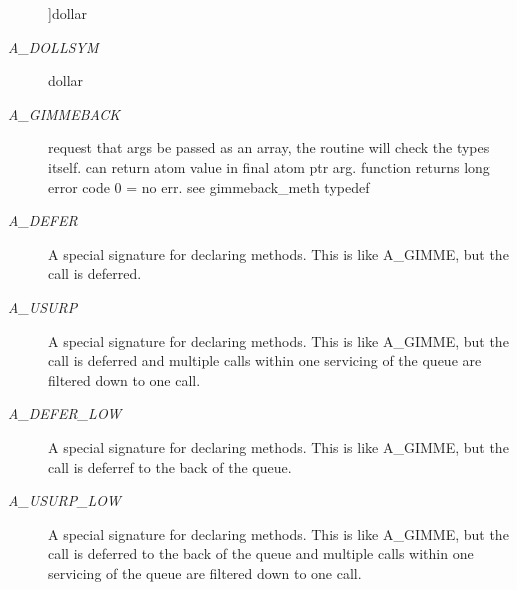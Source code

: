 \begin{Desc}
\begin{description}
{\label{group__atom_gga8aa6700e9f00b132eb376db6e39ade47af0a5a9017f6b59e82a4859cd0560d36b}
}]dollar \item[{\em 
\hypertarget{group__atom_gga8aa6700e9f00b132eb376db6e39ade47a9d47aadc47f728c2af7be2ec12a4a8c5}{
A\_\-DOLLSYM}
\label{group__atom_gga8aa6700e9f00b132eb376db6e39ade47a9d47aadc47f728c2af7be2ec12a4a8c5}
}]dollar \item[{\em 
\hypertarget{group__atom_gga8aa6700e9f00b132eb376db6e39ade47ad150bf3de9c8dc2ddfa0ca0ca2382360}{
A\_\-GIMMEBACK}
\label{group__atom_gga8aa6700e9f00b132eb376db6e39ade47ad150bf3de9c8dc2ddfa0ca0ca2382360}
}]request that args be passed as an array, the routine will check the types itself. can return atom value in final atom ptr arg. function returns long error code 0 = no err. see gimmeback\_\-meth typedef \item[{\em 
\hypertarget{group__atom_gga8aa6700e9f00b132eb376db6e39ade47abcb435e6fecfdcd79276dc8db1988db3}{
A\_\-DEFER}
\label{group__atom_gga8aa6700e9f00b132eb376db6e39ade47abcb435e6fecfdcd79276dc8db1988db3}
}]A special signature for declaring methods. This is like A\_\-GIMME, but the call is deferred. \item[{\em 
\hypertarget{group__atom_gga8aa6700e9f00b132eb376db6e39ade47af563cdbe6db453f24552bbe7fe6762d8}{
A\_\-USURP}
\label{group__atom_gga8aa6700e9f00b132eb376db6e39ade47af563cdbe6db453f24552bbe7fe6762d8}
}]A special signature for declaring methods. This is like A\_\-GIMME, but the call is deferred and multiple calls within one servicing of the queue are filtered down to one call. \item[{\em 
\hypertarget{group__atom_gga8aa6700e9f00b132eb376db6e39ade47a4556bc5fe0d4f8cc55eda5aeeee55cf2}{
A\_\-DEFER\_\-LOW}
\label{group__atom_gga8aa6700e9f00b132eb376db6e39ade47a4556bc5fe0d4f8cc55eda5aeeee55cf2}
}]A special signature for declaring methods. This is like A\_\-GIMME, but the call is deferref to the back of the queue. \item[{\em 
\hypertarget{group__atom_gga8aa6700e9f00b132eb376db6e39ade47a8c844b0a1b551341a6a5e3b95d2f1152}{
A\_\-USURP\_\-LOW}
\label{group__atom_gga8aa6700e9f00b132eb376db6e39ade47a8c844b0a1b551341a6a5e3b95d2f1152}
}]A special signature for declaring methods. This is like A\_\-GIMME, but the call is deferred to the back of the queue and multiple calls within one servicing of the queue are filtered down to one call. \end{description}
\end{Desc}



